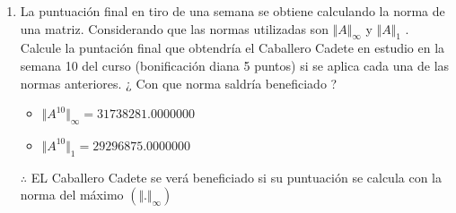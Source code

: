 \documentclass[10pt,a4paper]{article}
\begin{document}
\begin{enumerate}
	Matriz de puntuaciones de la semana  10.
	$$
	A^{10}\begin{bmatrix} %
1.0	&	0	&	0,   0,     0,       0,       0,   0,    0,      0,       0,        0
0,  9765625.0,         0,   0,     0,       0,       0,   0,    0,      0,       0,        0
2441406.0, 19531250.0, 9765625.0,   0,     0,       0,       0,   0,    0,      0,       0,        0
0,          0,         0, 1.0, -10.0, 0.e-125, 0.e-125,   0,    0,      0,       0,        0
0,          0,         0,   0,   1.0,       0,       0,   0,    0,      0,       0,        0
0,          0,         0,   0,     0,     1.0, 0.e-125,   0,    0,      0,       0,        0
0,          0,         0,   0,     0,       0,     1.0,   0,    0,      0,       0,        0
0,          0,         0,   0,     0,       0,       0, 1.0, 50.0, 1125.0, 15000.0, 131250.0
0,          0,         0,   0,     0,       0,       0,   0,  1.0,   50.0,  1125.0,  15000.0
0,          0,         0,   0,     0,       0,       0,   0,    0,    1.0,    50.0,   1125.0
0,          0,         0,   0,     0,       0,       0,   0,    0,      0,     1.0,     50.0
0,          0,         0,   0,     0,       0,       0,   0,    0,      0,       0,      1.0
\end{bmatrix}	
	$$    
	
	
	\item La puntuación final en tiro de una semana se obtiene calculando la norma de una matriz. Considerando que las normas utilizadas son $\Vert A\Vert_{\infty}$ y $\Vert A\Vert_{1}$ . Calcule la puntación final que obtendría el Caballero Cadete en estudio en la semana 10 del curso (bonificación diana 5 puntos) si se aplica cada una de las normas anteriores. ¿ Con que norma saldría beneficiado ?
		\begin{itemize}
			\item $\Vert A^{10}\Vert_{\infty} = 31738281.0000000$
			\item $\Vert A^{10}\Vert_{1} = 29296875.0000000$
		\end{itemize}
		$\therefore$ EL Caballero Cadete se verá beneficiado si su puntuación se calcula con la norma del máximo $(\Vert .\Vert_{\infty})$
\end{enumerate}









    
\end{document}
